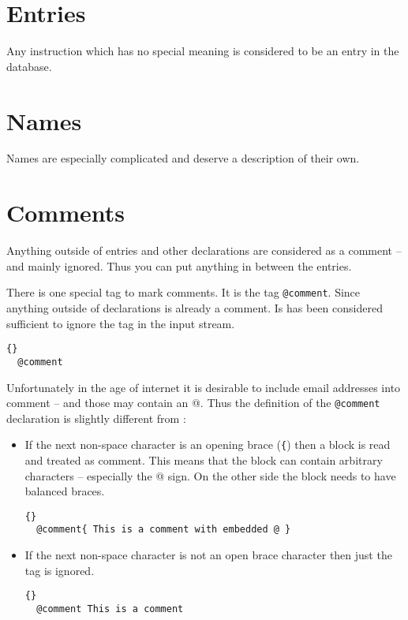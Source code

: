 
\section{Entries}

Any instruction which has no special meaning is considered to be an
entry in the database.

\INCOMPLETE

\section{Names}\label{sec:names}

Names are especially complicated and deserve a description of their
own.

\INCOMPLETE


\section{Comments}

Anything outside of entries and other declarations are considered as a
comment -- and mainly ignored. Thus you can put anything in between
the entries.

 There is one special tag to mark comments. It is the tag
\texttt{@comment}. Since anything outside of declarations is already a
comment. Is has been considered sufficient to ignore the tag in the
input stream.
\begin{lstlisting}{}
  @comment
\end{lstlisting}

Unfortunately in the age of internet it is desirable to include email
addresses into comment -- and those may contain an @. Thus the
definition of the \texttt{@comment} declaration is slightly different
from \BibTeX{}:
\begin{itemize}
\item If the next non-space character is an opening brace (\verb|{|)
  then a block is read and treated as comment. This means that the
  block can contain arbitrary characters -- especially the @ sign.
  On the other side the block needs to have balanced braces.
\begin{lstlisting}{}
  @comment{ This is a comment with embedded @ }
\end{lstlisting}
    
\item If the next non-space character is not an open brace character
  then just the tag is ignored.
\begin{lstlisting}{}
  @comment This is a comment
\end{lstlisting}
  
\end{itemize}


